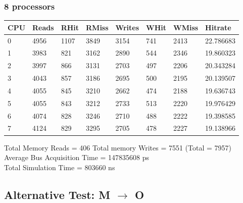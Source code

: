 \documentclass[]{article}
\begin{document}
\subsubsection{8 processors}

\begin{table}[H]
	\begin{tabular}{|l|l|l|l|l|l|l|l|}
		\hline
		\textbf{CPU} & \textbf{Reads} & \textbf{RHit} & \textbf{RMiss} & \textbf{Writes} & \textbf{WHit} & \textbf{WMiss} & \textbf{Hitrate} \\ \hline
		0            & 4956           & 1107          & 3849           & 3154            & 741           & 2413           & 22.786683        \\ \hline
		1            & 3983           & 821           & 3162           & 2890            & 544           & 2346           & 19.860323        \\ \hline
		2            & 3997           & 866           & 3131           & 2703            & 497           & 2206           & 20.343284        \\ \hline
		3            & 4043           & 857           & 3186           & 2695            & 500           & 2195           & 20.139507        \\ \hline
		4            & 4055           & 845           & 3210           & 2662            & 474           & 2188           & 19.636743        \\ \hline
		5            & 4055           & 843           & 3212           & 2733            & 513           & 2220           & 19.976429        \\ \hline
		6            & 4074           & 828           & 3246           & 2710            & 488           & 2222           & 19.398585        \\ \hline
		7            & 4124           & 829           & 3295           & 2705            & 478           & 2227           & 19.138966        \\ \hline
	\end{tabular}
\end{table}

Total Memory Reads = 406 Total memory Writes = 7551 (Total = 7957)\\
Average Bus Acquisition Time = 147835608 ps\\
Total Simulation Time = 803660 ns

\subsection{Alternative Test: M $\rightarrow$ O}
\end{document}
